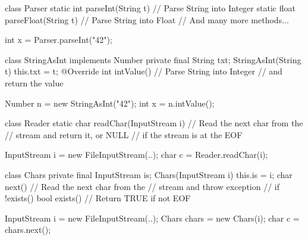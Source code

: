 \documentclass{article}
\begin{document}

\pptToc



\begin{pptWide}{2}
{\small\begin{ffcode}
class Parser {
  static int parseInt(String t) {
    // Parse String into Integer
  }
  static float parseFloat(String t) {
    // Parse String into Float
  }
  // And many more methods...
}

int x = Parser.parseInt("42");
\end{ffcode}
}
\par\columnbreak\par
{\small\begin{ffcode}
class StringAsInt implements Number {
  private final String txt;
  StringAsInt(String t) { this.txt = t; }
  @Override int intValue() {
    // Parse String into Integer
    // and return the value
  }
}

Number n = new StringAsInt("42");
int x = n.intValue();
\end{ffcode}
}
\end{pptWide}
\par
\plush{}

\begin{pptWide}{2}
{\small\begin{ffcode}
class Reader {
  static char readChar(InputStream i) {
    // Read the next char from the
    // stream and return it, or NULL
    // if the stream is at the EOF
  }
}

InputStream i = new FileInputStream(..);
char c = Reader.readChar(i);
\end{ffcode}
}
\par\columnbreak\par
{\small\begin{ffcode}
class Chars
  private final InputStream is;
  Chars(InputStream i)
    this.is = i;
  char next()
    // Read the next char from the
    // stream and throw exception
    // if !exists()
  bool exists()
    // Return TRUE if not EOF

InputStream i = new FileInputStream(..);
Chars chars = new Chars(i);
char c = chars.next();
\end{ffcode}
}
\end{pptWide}
\par
\plush{}
\end{document}

